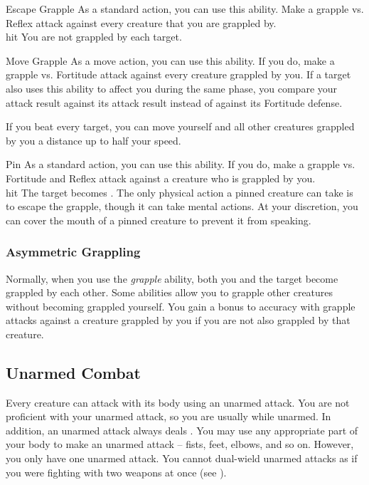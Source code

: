             \begin{ability}{Escape Grapple}
                As a standard action, you can use this ability.
                Make a grapple vs. Reflex attack against every creature that you are grappled by.
                \\hit You are not grappled by each target.
            \end{ability}

            \begin{ability}{Move Grapple}
                As a move action, you can use this ability.
                If you do, make a grapple vs. Fortitude attack against every creature grappled by you.
                If a target also uses this ability to affect you during the same phase, you compare your attack result against its attack result instead of against its Fortitude defense.

                If you beat every target, you can move yourself and all other creatures grappled by you a distance up to half your speed.
            \end{ability}

            \begin{ability}{Pin}
                As a standard action, you can use this ability.
                If you do, make a grapple vs. Fortitude and Reflex attack against a creature who is grappled by you.
                \\hit The target becomes .
                The only physical action a pinned creature can take is to escape the grapple, though it can take mental actions. At your discretion, you can cover the mouth of a pinned creature to prevent it from speaking.
            \end{ability}

        \subsubsection{Asymmetric Grappling}\label{Asymmetric Grappling}
            Normally, when you use the \textit{grapple} ability, both you and the target become grappled by each other.
            Some abilities allow you to grapple other creatures without becoming grappled yourself.
            You gain a  bonus to accuracy with grapple attacks against a creature grappled by you if you are not also grappled by that creature.

    \subsection{Unarmed Combat}\label{Unarmed Combat}
        Every creature can attack with its body using an unarmed attack.
        You are not proficient with your unarmed attack, so you are usually  while unarmed.
        In addition, an unarmed attack always deals .
        You may use any appropriate part of your body to make an unarmed attack -- fists, feet, elbows, and so on.
        However, you only have one unarmed attack.
        You cannot dual-wield unarmed attacks as if you were fighting with two weapons at once (see ).


